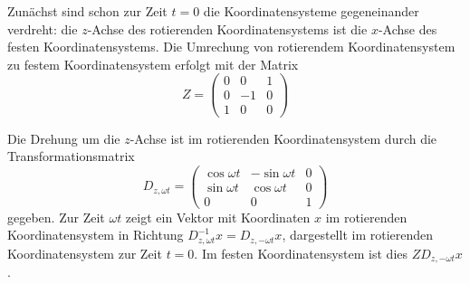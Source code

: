 \begin{loesung}
Zunächst sind schon zur Zeit $t=0$ die Koordinatensysteme gegeneinander
verdreht: die $z$-Achse des rotierenden Koordinatensystems ist die 
$x$-Achse des festen Koordinatensystems.
Die Umrechung von rotierendem Koordinatensystem zu festem Koordinatensystem
erfolgt mit der Matrix
\[
Z
=
\begin{pmatrix}
0& 0&1\\
0&-1&0\\
1& 0&0
\end{pmatrix}
\]

Die Drehung um die $z$-Achse ist im rotierenden Koordinatensystem
durch die Transformationsmatrix
\[
D_{z,\omega t}
=
\begin{pmatrix}
\cos\omega t &-\sin\omega t & 0\\
\sin\omega t & \cos\omega t & 0\\
     0       &     0        & 1
\end{pmatrix}
\]
gegeben.
Zur Zeit $\omega t$ zeigt ein Vektor mit Koordinaten $x$ im rotierenden
Koordinatensystem in Richtung $D_{z,\omega t}^{-1}x=D_{z,-\omega t}x$,
dargestellt im rotierenden Koordinatensystem zur Zeit $t=0$.
Im festen Koordinatensystem ist dies $ZD_{z,-\omega t}x$.


\end{loesung}
